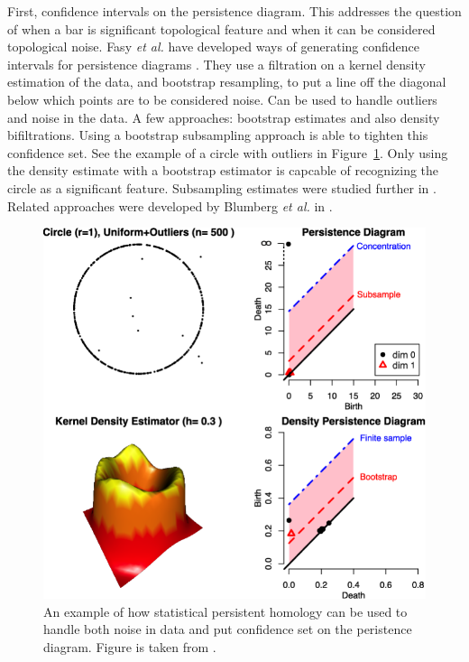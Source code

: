 First, confidence intervals on the persistence diagram.
This addresses the question of when a bar is significant topological feature and when it can be considered topological noise.
Fasy \emph{et al.} have developed ways of generating confidence intervals for persistence diagrams \citep{Fasy:2014}.
They use a filtration on a kernel density estimation of the data, and bootstrap resampling, to put a line off the diagonal below which points are to be considered noise.
Can be used to handle outliers and noise in the data.
A few approaches: bootstrap estimates and also density bifiltrations.
Using a bootstrap subsampling approach is able to tighten this confidence set.
See the example of a circle with outliers in Figure~\ref{fig:bg:fasy_confidence_set}.
Only using the density estimate with a bootstrap estimator is capcable of recognizing the circle as a significant feature.
Subsampling estimates were studied further in \cite{Chazal:2014wp}.
Related approaches were developed by Blumberg \emph{et al.} in \cite{Blumberg:2014bq}.

\begin{figure}
\centering
\includegraphics[]{fig/background/fasy_confidence_set.pdf}
\caption[Statistical TDA]{An example of how statistical persistent homology can be used to handle both noise in data and put confidence set on the peristence diagram. Figure is taken from \cite{Fasy:2014}.}
\label{fig:bg:fasy_confidence_set}
\end{figure}

